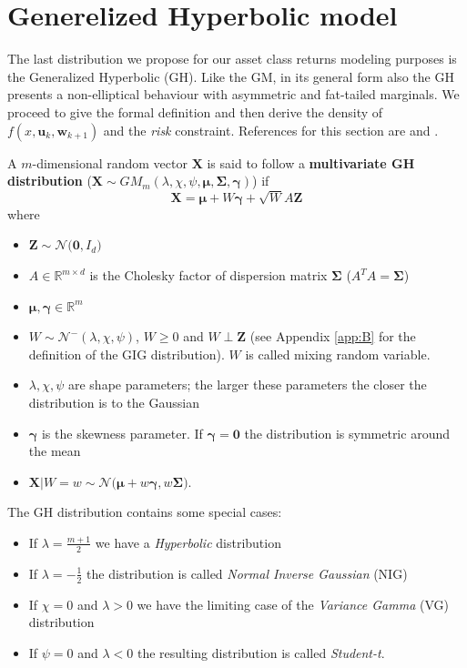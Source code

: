 \section{Generelized Hyperbolic model}
The last distribution we propose for our asset class returns modeling purposes is the Generalized Hyperbolic (GH). Like the GM, in its general form also the GH presents a non-elliptical behaviour with asymmetric and fat-tailed marginals. We proceed to give the formal definition and then derive the density of $f(x,\bm{u}_k,\bm{w}_{k+1})$
and the \textit{risk} constraint. References for this section are \cite{Brey2013} and \cite{McNeil2005}.
\begin{definition}[GH distribution]\label{def:GH}
	A $m$-dimensional random vector $\bm{X}$ is said to follow a \textbf{multivariate GH distribution} ($\bm{X} \sim GM_m(\lambda,\chi,\psi,\bm{\mu},\bm{\Sigma},\bm{\gamma})$) if \[ \bm{X} = \bm{\mu}+W\bm{\gamma}+\sqrt{W}A\bm{Z} \] where 
	\begin{itemize}
		\item $\bm{Z} \sim \mathcal{N}\big(\bm{0},I_d\big)$
		\item $A \in \mathbb{R}^{m \times d} $ is the Cholesky factor of dispersion matrix $\bm{\Sigma}$ ($A^TA = \bm{\Sigma}$)
		\item $\bm{\mu}, \bm{\gamma} \in \mathbb{R}^m$
		\item $W \sim \mathcal{N}^-(\lambda,\chi,\psi)$, $W \geq 0$ and $W \perp \bm{Z}$ (see Appendix \ref{app:B} for the definition of the GIG distribution). $W$ is called mixing random variable.
	\end{itemize}
\end{definition}
\begin{remark}
	\begin{itemize}
		\item $\lambda,\chi,\psi$ are shape parameters; the larger these parameters the closer the distribution is to the Gaussian
		\item $\bm{\gamma}$ is the skewness parameter. If $\bm{\gamma}= \bm{0}$ the distribution is symmetric around the mean
		\item $\bm{X}\lvert W = w \sim \mathcal{N}\big(\bm{\mu}+w\bm{\gamma},w\bm{\Sigma}\big)$.
	\end{itemize}
\end{remark}
The GH distribution contains some special cases:
\begin{itemize}
	\item If $\lambda=\frac{m+1}{2}$ we have a \textit{Hyperbolic} distribution
	\item If $\lambda=-\frac{1}{2}$ the distribution is called \textit{Normal Inverse Gaussian} (NIG)
	\item If $\chi = 0$ and $\lambda > 0$ we have the limiting case of the \textit{Variance Gamma} (VG) distribution
	\item If $\psi = 0$ and $\lambda < 0$ the resulting distribution is called \textit{Student-t}.
\end{itemize}
	
